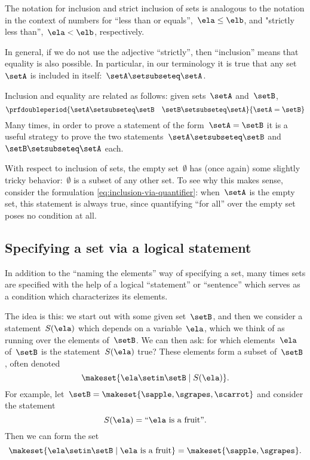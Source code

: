The notation for inclusion and strict inclusion of sets is analogous to the notation in the context of numbers for ``less than or equals'',~$\ela \leq \elb$,  and "strictly less than'',~$\ela < \elb$, respectively.

In general, if we do not use the adjective ``strictly'', then ``inclusion'' means that equality is also possible.
In particular, in our terminology it is true that any set~$\setA$ is included in itself:~$\setA \setsubseteq \setA$.

Inclusion and equality are related as follows: given sets~$\setA$ and~$\setB$,
%
\begin{equation*}
    \prfdoubleperiod
    {\setA \setsubseteq \setB
        \quad
        \setB \setsubseteq \setA}{
        \setA = \setB}
\end{equation*}
%
Many times, in order to prove a statement of the form~$\setA = \setB$ it is a useful strategy to prove the two statements~$\setA \setsubseteq \setB$ and~$\setB \setsubseteq \setA$ each.

With respect to inclusion of sets, the empty set~$\emptyset$ has (once again) some slightly tricky behavior:~$\emptyset$ is a subset of any other set.
To see why this makes sense, consider the formulation \cref{eq:inclusion-via-quantifier}: when~$\setA$ is the empty set, this statement is always true, since quantifying ``for all'' over the empty set poses no condition at all.

\subsection{Specifying a set via a logical statement}

In addition to the ``naming the elements'' way of specifying a set, many times sets are specified with the help of a logical ``statement'' or ``sentence'' which serves as a condition which characterizes its elements.

The idea is this: we start out with some given set~$\setB$, and then we consider a statement~$S(\ela)$ which depends on a variable~$\ela$, which we think of as running over the elements of~$\setB$.
We can then ask: for which elements~$\ela$ of~$\setB$ is the statement~$S(\ela)$ true?
These elements form a subset of~$\setB$, often denoted
%
\begin{equation}
    \label{eq:axiom-specialization}
    \makeset{ \ela \setin\setB \mid S(\ela) }.
\end{equation}
%
For example, let~$\setB = \makeset{ \sapple, \sgrapes, \scarrot}$ and consider the statement
%
\begin{equation*}
    S(\ela) = \text{``$\ela$ is a fruit''}.
\end{equation*}
%
Then we can form the set
%
\begin{equation*}
    \makeset{ \ela \setin\setB \mid \ela \text{ is a fruit} } = \makeset{ \sapple, \sgrapes }.
\end{equation*}

